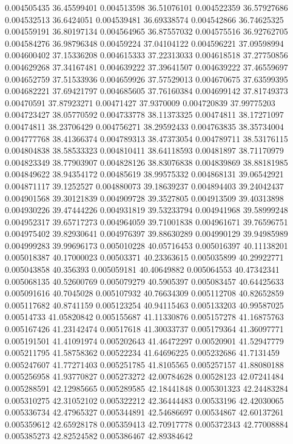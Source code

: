 0.004505435	36.45599401
0.004513598	36.51076101
0.004522359	36.57927686
0.004532513	36.6424051
0.004539481	36.69338574
0.004542866	36.74625325
0.004559191	36.80197134
0.004564965	36.87557032
0.004575516	36.92762705
0.004584276	36.98796348
0.00459224	37.04104122
0.004596221	37.09598994
0.004600402	37.15336208
0.004615333	37.22313033
0.004618518	37.27750856
0.004629268	37.34167481
0.004639222	37.39641507
0.004639222	37.46559697
0.004652759	37.51533936
0.004659926	37.57529013
0.004670675	37.63599395
0.004682221	37.69421797
0.004685605	37.76160384
0.004699142	37.81749373
0.00470591	37.87923271
0.00471427	37.9370009
0.004720839	37.99775203
0.004723427	38.05770592
0.004733778	38.11373325
0.00474811	38.17271097
0.00474811	38.23706429
0.004756271	38.29592433
0.004763835	38.35734004
0.004777768	38.41366374
0.004789313	38.47373054
0.004789711	38.53176115
0.004804838	38.58533323
0.004810411	38.64118593
0.00481897	38.71170979
0.004823349	38.77903907
0.004828126	38.83076838
0.004839869	38.88181985
0.004849622	38.94354172
0.00485619	38.99575332
0.004868131	39.06542921
0.004871117	39.1252527
0.004880073	39.18639237
0.004894403	39.24042437
0.004901568	39.30121839
0.004909728	39.3527805
0.004913509	39.40313898
0.004930226	39.47444226
0.004931819	39.53233794
0.004941968	39.58999248
0.004952317	39.65717273
0.004964059	39.71001838
0.004961671	39.76596751
0.004975402	39.82930641
0.004976397	39.88630289
0.004990129	39.94985989
0.004999283	39.99696173
0.005010228	40.05716453
0.005016397	40.11138201
0.005018387	40.17000023
0.00503371	40.23363615
0.005035899	40.29922771
0.005043858	40.356393
0.005059181	40.40649882
0.005064553	40.47342341
0.005068135	40.52600769
0.005079279	40.5905397
0.005083457	40.64425633
0.005091616	40.7045028
0.005107932	40.76634309
0.005112708	40.82652859
0.005117682	40.8741159
0.005123254	40.94115463
0.005133203	40.99587025
0.00514733	41.05820842
0.005155687	41.11330876
0.005157278	41.16875763
0.005167426	41.23142474
0.00517618	41.30033737
0.005179364	41.36097771
0.005191501	41.41091974
0.005202643	41.46472297
0.00520901	41.52947779
0.005211795	41.58758362
0.00522234	41.64696225
0.005232686	41.7131459
0.005247607	41.77271403
0.005251785	41.8105565
0.005257157	41.88080188
0.005256958	41.93770827
0.005273272	42.00784628
0.00528123	42.07241484
0.005288591	42.12985665
0.005289585	42.18441848
0.005301323	42.24483284
0.005310275	42.31052102
0.005322212	42.36444483
0.00533196	42.42030065
0.005336734	42.47965327
0.005344891	42.54686697
0.00534867	42.60137261
0.005359612	42.65928178
0.005359413	42.70917778
0.005372343	42.77008884
0.005385273	42.82524582
0.005386467	42.89384642
